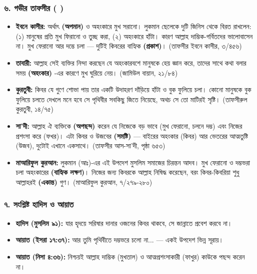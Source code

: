 \subsubsection*{৬. গভীর তাফসীর ( )}

\begin{itemize}
\item \textbf{ইবনে কাসীর:}  অর্থাৎ \textbf{ (অপমান)} ও অহংকারে মুখ সরানো। লুকমান ছেলেকে দুটি জিনিস থেকে বিরত রাখলেন: (১) মানুষের প্রতি মুখ ফিরানো ও তুচ্ছ করা, (২) অহংকারে হাঁটা। কারণ আল্লাহ দাম্ভিক-গর্বিতদের ভালোবাসেন না। মুখ ফেরানো আর দম্ভে চলা — দুটিই কিবরের বাহ্যিক \textbf{ (প্রকাশ)}। (তাফসীর ইবনে কাসীর, ৩/৪৫৬)
\item \textbf{তাবারী:} আল্লাহ সেই ব্যক্তির নিন্দা করছেন যে অহংকারবশে মানুষকে হেয় জ্ঞান করে, তাদের সাথে কথা বলার সময় \textbf{ (অহংকার)} -এর কারণে মুখ ঘুরিয়ে নেয়। (জামিউল বায়ান, ২১/৮৪)
\item \textbf{কুরতুবী:} কিবর যে গুণে শোভা পায় তার একটি উদাহরণ দাঁড়িয়ে হাঁটা ও বুক ফুলিয়ে চলা। কোনো মানুষকে বুক ফুলিয়ে চলতে দেখলে মনে হবে সে পৃথিবীর সবকিছু জিতে নিয়েছে, অথচ সে তো মাটিরই সৃষ্টি। (তাফসীরুল কুরতুবী, ১৪/৭৫)
\item \textbf{সা'দী:} আল্লাহ ঐ ব্যক্তিকে \textbf{ (অপছন্দ)} করেন যে নিজেকে বড় ভাবে (মুখ ফেরানো, চলনে দম্ভ) এবং নিজের প্রশংসা করে (ফখর)। এটা কিবর ও উজবের \textbf{ (সমষ্টি)} — বাইরের অহংকার (কিবর) আর ভেতরের আত্মতুষ্টি (উজব), দুটোই এখানে একসাথে। (তাফসীর আস-সা'দী, পৃষ্ঠা ৬৫৩)
\item \textbf{মাআরিফুল কুরআন:} লুকমান (আঃ)-এর এই উপদেশ মুসলিম সমাজের চিরন্তন আদব। মুখ ফেরানো ও দম্ভভরা চলা অহংকারের \textbf{  (বাহ্যিক লক্ষণ)}। নিজের জন্য কিবরকে আল্লাহ নিষিদ্ধ করেছেন, বরং কিবর-কিবরিয়া শুধু আল্লাহরই \textbf{ (একান্ত)} গুণ। (মাআরিফুল কুরআন, ৭/২৭৯-২৮০)
\end{itemize}
\subsubsection*{৭. সংশ্লিষ্ট হাদিস ও আয়াত}

\begin{itemize}
\item \textbf{হাদিস (মুসলিম ৯১):} যার হৃদয়ে সরিষার দানার ওজনের কিবর থাকবে, সে জান্নাতে প্রবেশ করবে না।
\item \textbf{আয়াত (ইসরা ১৭:৩৭):} আর তুমি পৃথিবীতে দম্ভভরে চলো না... — একই উপদেশ ভিন্ন সূরায়।
\item \textbf{আয়াত (নিসা ৪:৩৬):} নিশ্চয়ই আল্লাহ দাম্ভিক (মুখতাল) ও আত্মপ্রশংসাকারী (ফাখুর) কাউকে পছন্দ করেন না।
\end{itemize}
